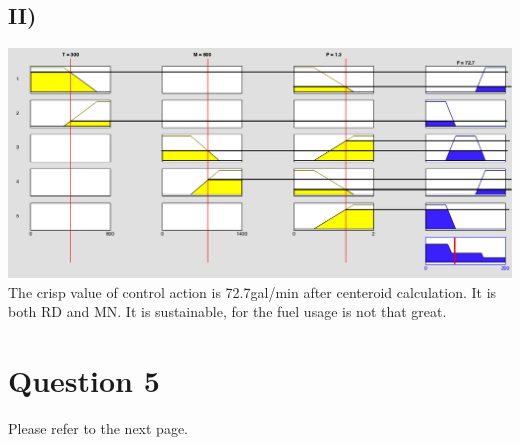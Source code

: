 \documentclass[12pt, letterpaper]{article}
\begin{document}
\subsection*{II)}
\includegraphics[scale=0.2]{4II.png}\\
The crisp value of control action is 72.7gal/min after centeroid calculation. It is both RD and MN. It is sustainable, for the fuel usage is not that great.

\pagebreak

\section*{Question 5}
Please refer to the next page.


\pagebreak
\end{document}
